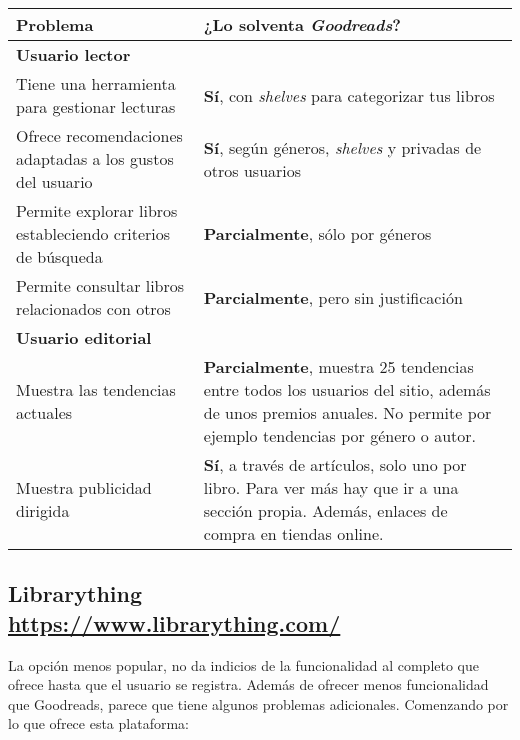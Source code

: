 \begin{table}[H]
    \begin{tabularx}{\linewidth}{|X|X|}
        \hline
        \textbf{Problema} & \textbf{¿Lo solventa \textit{Goodreads}?} \\
        \hline
        \hline
        \multicolumn{2}{|l|}{\textbf{Usuario lector}} \\
        \hline
        Tiene una herramienta para gestionar lecturas     & \textbf{Sí}, con \textit{shelves} para categorizar tus libros \\ 
        \hline
        Ofrece recomendaciones adaptadas a los gustos del usuario & \textbf{Sí}, según géneros, \textit{shelves} y privadas de otros usuarios \\ 
        \hline
        Permite explorar libros estableciendo criterios de búsqueda   & \textbf{Parcialmente}, sólo por géneros \\ 
        \hline
        Permite consultar libros relacionados con otros   & \textbf{Parcialmente}, pero sin justificación \\ 
        \hline
        \multicolumn{2}{|l|}{ \textbf{Usuario editorial}} \\
        \hline
        Muestra las tendencias actuales     & \textbf{Parcialmente}, muestra 25 tendencias entre todos los usuarios del sitio, además de unos premios anuales. No permite por ejemplo tendencias por género o autor. \\ 
        \hline
        Muestra publicidad dirigida     & \textbf{Sí}, a través de artículos, solo uno por libro. Para ver más hay que ir a una sección propia. Además, enlaces de compra en tiendas online. \\ 
        \hline
    \end{tabularx}
\end{table}

\subsection[Librarything]{Librarything\\ {\large \url{https://www.librarything.com/}}}

La opción menos popular, no da indicios de la funcionalidad al completo que ofrece hasta que el usuario se registra. Además de ofrecer menos funcionalidad que Goodreads, parece que tiene algunos problemas adicionales. Comenzando por lo que ofrece esta plataforma:

